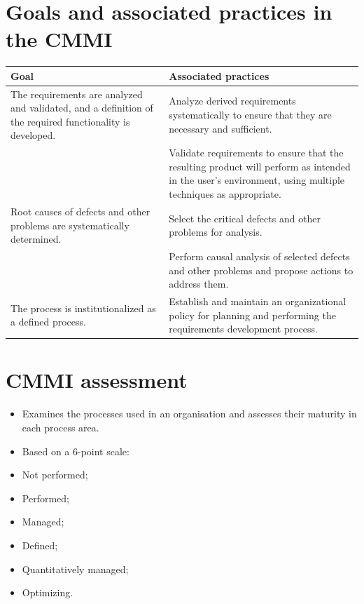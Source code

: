 \section{Goals and associated practices in the CMMI}

\begin{table}[h!]
\centering
\begin{tabular}{ |p{5cm}|p{5cm}|  }
\hline
Goal & Associated practices \\
\hline
The requirements are analyzed and validated, and a definition of the required functionality is developed. & Analyze derived requirements systematically to ensure that they are necessary and sufficient.\\
\hline
& Validate requirements to ensure that the resulting product will perform as intended in the user’s environment, using multiple techniques as appropriate.\\
\hline
Root causes of defects and other problems are systematically determined. & Select the critical defects and other problems for analysis.\\
\hline
 & Perform causal analysis of selected defects and other problems and propose actions to address them.\\
 \hline
The process is institutionalized as a defined process. & Establish and maintain an organizational policy for planning and performing the requirements development process.\\
\hline
\end{tabular}

\label{table:T9_4}
\end{table}

\section{CMMI assessment}
\begin{itemize}

\item Examines the processes used in an organisation and assesses their maturity in each process area.

\item Based on a 6-point scale:    \item Not performed;    \item Performed;
   \item Managed;    \item Defined;
   \item Quantitatively managed;    \item Optimizing.

\end{itemize}

